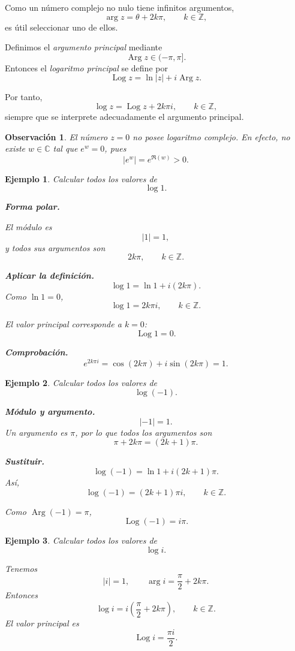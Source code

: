 \documentclass[12pt]{article}
\newtheorem{ejemplo}{Ejemplo}[section]
\newtheorem{Obs}{Observaci\'on}[section]
\begin{document}
Como un número complejo no nulo tiene infinitos argumentos,
\[
\arg z=\theta+2k\pi,\qquad k\in\mathbb Z,
\]
es útil seleccionar uno de ellos.

Definimos el \emph{argumento principal} mediante
\[
\operatorname{Arg}z\in(-\pi,\pi].
\]
Entonces el \emph{logaritmo principal} se define por
\[
\boxed{
\operatorname{Log}z=\ln|z|+i\operatorname{Arg}z.
}
\]

Por tanto,
\[
\log z
=
\operatorname{Log}z+2k\pi i,
\qquad k\in\mathbb Z,
\]
siempre que se interprete adecuadamente el argumento principal.

\begin{Obs}
El número $z=0$ no posee logaritmo complejo. En efecto, no existe
$w\in\mathbb C$ tal que $e^w=0$, pues
\[
|e^w|=e^{\Re(w)}>0.
\]
\end{Obs}

\begin{ejemplo}
Calcular todos los valores de
\[
\log 1.
\]

\textbf{Forma polar.}

El módulo es
\[
|1|=1,
\]
y todos sus argumentos son
\[
2k\pi,\qquad k\in\mathbb Z.
\]

\textbf{Aplicar la definición.}
\[
\log1=\ln1+i(2k\pi).
\]
Como $\ln1=0$,
\[
\boxed{
\log1=2k\pi i,\qquad k\in\mathbb Z.
}
\]

El valor principal corresponde a $k=0$:
\[
\boxed{\operatorname{Log}1=0.}
\]

\textbf{Comprobación.}
\[
e^{2k\pi i}
=\cos(2k\pi)+i\sin(2k\pi)
=1.
\]
\end{ejemplo}

\begin{ejemplo}
Calcular todos los valores de
\[
\log(-1).
\]

\textbf{Módulo y argumento.}
\[
|-1|=1.
\]
Un argumento es $\pi$, por lo que todos los argumentos son
\[
\pi+2k\pi=(2k+1)\pi.
\]

\textbf{Sustituir.}
\[
\log(-1)
=\ln1+i(2k+1)\pi.
\]
Así,
\[
\boxed{
\log(-1)=(2k+1)\pi i,\qquad k\in\mathbb Z.
}
\]

Como $\operatorname{Arg}(-1)=\pi$,
\[
\boxed{\operatorname{Log}(-1)=i\pi.}
\]
\end{ejemplo}

\begin{ejemplo}
Calcular todos los valores de
\[
\log i.
\]

Tenemos
\[
|i|=1,\qquad
\arg i=\frac{\pi}{2}+2k\pi.
\]
Entonces
\[
\boxed{
\log i=i\left(\frac{\pi}{2}+2k\pi\right),
\qquad k\in\mathbb Z.
}
\]
El valor principal es
\[
\boxed{\operatorname{Log}i=\frac{\pi i}{2}.}
\]
\end{ejemplo}
\end{document}
